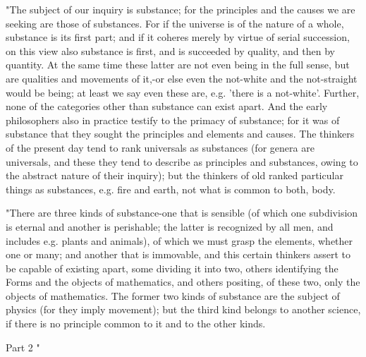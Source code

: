 "The subject of our inquiry is substance; for the principles and the
causes we are seeking are those of substances. For if the universe
is of the nature of a whole, substance is its first part; and if it
coheres merely by virtue of serial succession, on this view also substance
is first, and is succeeded by quality, and then by quantity. At the
same time these latter are not even being in the full sense, but are
qualities and movements of it,-or else even the not-white and the
not-straight would be being; at least we say even these are, e.g.
'there is a not-white'. Further, none of the categories other than
substance can exist apart. And the early philosophers also in practice
testify to the primacy of substance; for it was of substance that
they sought the principles and elements and causes. The thinkers of
the present day tend to rank universals as substances (for genera
are universals, and these they tend to describe as principles and
substances, owing to the abstract nature of their inquiry); but the
thinkers of old ranked particular things as substances, e.g. fire
and earth, not what is common to both, body. 

"There are three kinds of substance-one that is sensible (of which
one subdivision is eternal and another is perishable; the latter is
recognized by all men, and includes e.g. plants and animals), of which
we must grasp the elements, whether one or many; and another that
is immovable, and this certain thinkers assert to be capable of existing
apart, some dividing it into two, others identifying the Forms and
the objects of mathematics, and others positing, of these two, only
the objects of mathematics. The former two kinds of substance are
the subject of physics (for they imply movement); but the third kind
belongs to another science, if there is no principle common to it
and to the other kinds. 

Part 2 "

